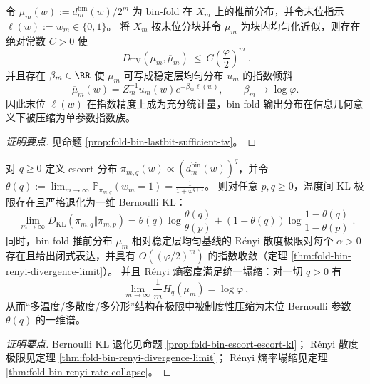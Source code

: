 \begin{conclusion}\label{con:xi-terminal-foldbin-lastbit-sufficient-statistic}
令 \(\mu_m(w):=d_m^{\mathrm{bin}}(w)/2^m\) 为 bin-fold 在 \(X_m\) 上的推前分布，并令末位指示 \(\ell(w):=w_m\in\{0,1\}\)。
将 \(X_m\) 按末位分块并令 \(\overline\mu_m\) 为块内均匀化近似，则存在绝对常数 \(C>0\) 使
\[
\boxed{\ D_{\mathrm{TV}}(\mu_m,\overline\mu_m)\ \le\ C\left(\frac{\varphi}{2}\right)^{m}\ }.
\]
并且存在 \(\beta_m\in\RR\) 使 \(\overline\mu_m\) 可写成稳定层均匀分布 \(u_m\) 的指数倾斜
\[
\overline\mu_m(w)=Z_m^{-1}u_m(w)e^{-\beta_m\ell(w)},
\qquad
\beta_m\to\log\varphi.
\]
因此末位 \(\ell(w)\) 在指数精度上成为充分统计量，bin-fold 输出分布在信息几何意义下被压缩为单参数指数族。
\end{conclusion}
\begin{proof}[证明要点]
见命题 \ref{prop:fold-bin-lastbit-sufficient-tv}。
\end{proof}

\begin{conclusion}\label{con:xi-terminal-foldbin-escort-divergence-two-state-closure}
对 \(q\ge 0\) 定义 escort 分布 \(\pi_{m,q}(w)\propto (d_m^{\mathrm{bin}}(w))^{q}\)，并令
\(
\theta(q):=\lim_{m\to\infty}\mathbb{P}_{\pi_{m,q}}(w_m=1)
=\frac{1}{1+\varphi^{q+1}}
\)。
则对任意 \(p,q\ge 0\)，温度间 KL 极限存在且严格退化为一维 Bernoulli KL：
\[
\boxed{\;
\lim_{m\to\infty}D_{\mathrm{KL}}(\pi_{m,q}\Vert\pi_{m,p})
=\theta(q)\log\!\frac{\theta(q)}{\theta(p)}+(1-\theta(q))\log\!\frac{1-\theta(q)}{1-\theta(p)}\; }.
\]
同时，bin-fold 推前分布 \(\mu_m\) 相对稳定层均匀基线的 Rényi 散度极限对每个 \(\alpha>0\) 存在且给出闭式表达，并具有 \(O((\varphi/2)^m)\) 的指数收敛（定理 \ref{thm:fold-bin-renyi-divergence-limit}）。
并且 Rényi 熵密度满足统一塌缩：对一切 \(q>0\) 有
\[
\boxed{\ \lim_{m\to\infty}\frac{1}{m}H_q(\mu_m)=\log\varphi\ },
\]
从而“多温度/多散度/多分形”结构在极限中被制度性压缩为末位 Bernoulli 参数 \(\theta(q)\) 的一维谱。
\end{conclusion}
\begin{proof}[证明要点]
Bernoulli KL 退化见命题 \ref{prop:fold-bin-escort-escort-kl}；
Rényi 散度极限见定理 \ref{thm:fold-bin-renyi-divergence-limit}；
Rényi 熵率塌缩见定理 \ref{thm:fold-bin-renyi-rate-collapse}。
\end{proof}



